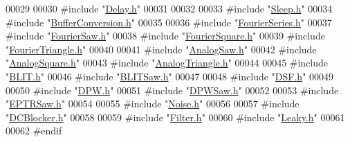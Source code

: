 \begin{DoxyCode}
00029 
00030 \textcolor{preprocessor}{#include "\hyperlink{_delay_8h}{Delay.h}"}
00031 
00032 
00033 \textcolor{preprocessor}{#include "\hyperlink{_sleep_8h}{Sleep.h}"}
00034 \textcolor{preprocessor}{#include "\hyperlink{_buffer_conversion_8h}{BufferConversion.h}"}
00035 
00036 \textcolor{preprocessor}{#include "\hyperlink{_fourier_series_8h}{FourierSeries.h}"}
00037 \textcolor{preprocessor}{#include "\hyperlink{_fourier_saw_8h}{FourierSaw.h}"}
00038 \textcolor{preprocessor}{#include "\hyperlink{_fourier_square_8h}{FourierSquare.h}"}
00039 \textcolor{preprocessor}{#include "\hyperlink{_fourier_triangle_8h}{FourierTriangle.h}"}
00040 
00041 \textcolor{preprocessor}{#include "\hyperlink{_analog_saw_8h}{AnalogSaw.h}"}
00042 \textcolor{preprocessor}{#include "\hyperlink{_analog_square_8h}{AnalogSquare.h}"}
00043 \textcolor{preprocessor}{#include "\hyperlink{_analog_triangle_8h}{AnalogTriangle.h}"}
00044 
00045 \textcolor{preprocessor}{#include "\hyperlink{_b_l_i_t_8h}{BLIT.h}"}
00046 \textcolor{preprocessor}{#include "\hyperlink{_b_l_i_t_saw_8h}{BLITSaw.h}"}
00047 
00048 \textcolor{preprocessor}{#include "\hyperlink{_d_s_f_8h}{DSF.h}"}
00049 
00050 \textcolor{preprocessor}{#include "\hyperlink{_d_p_w_8h}{DPW.h}"}
00051 \textcolor{preprocessor}{#include "\hyperlink{_d_p_w_saw_8h}{DPWSaw.h}"}
00052 
00053 \textcolor{preprocessor}{#include "\hyperlink{_e_p_t_r_saw_8h}{EPTRSaw.h}"}
00054 
00055 \textcolor{preprocessor}{#include "\hyperlink{_noise_8h}{Noise.h}"}
00056 
00057 \textcolor{preprocessor}{#include "\hyperlink{_d_c_blocker_8h}{DCBlocker.h}"}
00058 
00059 \textcolor{preprocessor}{#include "\hyperlink{_filter_8h}{Filter.h}"}
00060 \textcolor{preprocessor}{#include "\hyperlink{_leaky_8h}{Leaky.h}"}
00061 
00062 \textcolor{preprocessor}{#endif}
\end{DoxyCode}
